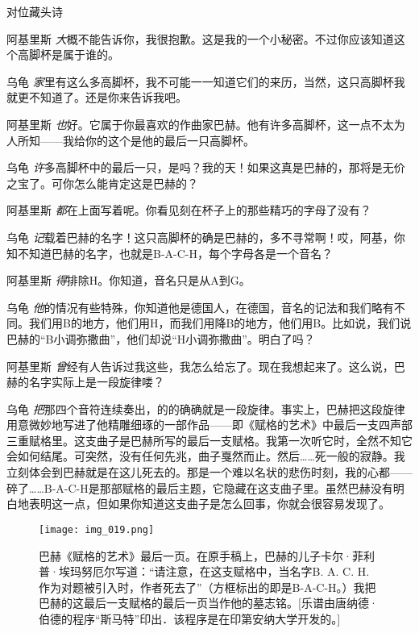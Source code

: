 \begin{dialog}{对位藏头诗}
\begin{dialogue}
\item[阿基里斯]\emph{大}概不能告诉你，我很抱歉。这是我的一个小秘密。不过你应该知道这个高脚杯是属于谁的。

\item[乌龟]\emph{家}里有这么多高脚杯，我不可能一一知道它们的来历，当然，这只高脚杯我就更不知道了。还是你来告诉我吧。

\item[阿基里斯]\emph{也}好。它属于你最喜欢的作曲家巴赫。他有许多高脚杯，这一点不太为人所知——我给你的这个是他的最后一只高脚杯。

\item[乌龟]\emph{许}多高脚杯中的最后一只，是吗？我的天！如果这真是巴赫的，那将是无价之宝了。可你怎么能肯定这是巴赫的？

\item[阿基里斯]\emph{都}在上面写着呢。你看见刻在杯子上的那些精巧的字母了没有？

\item[乌龟]\emph{记}载着巴赫的名字！这只高脚杯的确是巴赫的，多不寻常啊！哎，阿基，你知不知道巴赫的名字，也就是B-A-C-H，每个字母各是一个音名？

\item[阿基里斯]\emph{得}排除H。你知道，音名只是从A到G。

\item[乌龟]\emph{他}的情况有些特殊，你知道他是德国人，在德国，音名的记法和我们略有不同。我们用B的地方，他们用H，而我们用降B的地方，他们用B。比如说，我们说巴赫的“B小调弥撒曲”，他们却说“H小调弥撒曲”。明白了吗？

\item[阿基里斯]\emph{曾}经有人告诉过我这些，我怎么给忘了。现在我想起来了。这么说，巴赫的名字实际上是一段旋律喽？

\item[乌龟]\emph{把}那四个音符连续奏出，的的确确就是一段旋律。事实上，巴赫把这段旋律用意微妙地写进了他精雕细琢的一部作品——即《赋格的艺术》中最后一支四声部三重赋格里。这支曲子是巴赫所写的最后一支赋格。我第一次听它时，全然不知它会如何结尾。可突然，没有任何先兆，曲子戛然而止。然后……死一般的寂静。我立刻体会到巴赫就是在这儿死去的。那是一个难以名状的悲伤时刻，我的心都——碎了……B-A-C-H是那部赋格的最后主题，它隐藏在这支曲子里。虽然巴赫没有明白地表明这一点，但如果你知道这支曲子是怎么回事，你就会很容易发现了。

\begin{figure}
\texttt{[image: img\_019.png]}
\caption[巴赫《赋格的艺术》的最后一页。]
  {巴赫《赋格的艺术》最后一页。在原手稿上，巴赫的儿子卡尔·菲利普·埃玛努厄尔写道：“请注意，在这支赋格中，当名字B. A. C. H.作为对题被引入时，作者死去了”（方框标出的即是B-A-C-H。）我把巴赫的这最后一支赋格的最后一页当作他的墓志铭。[乐谱由唐纳德·伯德的程序“斯马特”印出．该程序是在印第安纳大学开发的。]}
\end{figure}


\end{dialogue}
\end{dialog}
